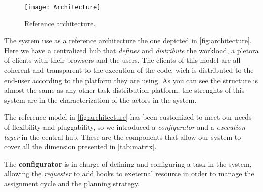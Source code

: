




\begin{figure}[htb]
	\centering
	\texttt{[image: Architecture]}
	\caption{Reference architecture.}
	\label{fig:architecture}
\end{figure}
The system use as a reference architecture the one depicted in \autoref{fig:architecture}.
Here we have a centralized hub that \emph{defines} and \emph{distribute} the workload,
a pletora of clients with their browsers and the users. The clients of this model
are all coherent and transparent to the execution of the code, wich is distributed
to the end-user according to the platform they are using.
As you can see the structure is almost the same as any other task distribution
platform, the strenghts of this system are in the characterization of the actors
in the system.

The reference model in \autoref{fig:architecture} has been customized to meet our
needs of flexibility and pluggability, so we introduced a \emph{configurator} and
a \emph{execution layer} in the central hub. These are the components that allow
our system to cover all the dimension presented in \autoref{tab:matrix}.

The \textbf{configurator} is in charge of defining and configuring a task in the
system, allowing the \emph{requester} to add hooks to exeternal resource in order
to manage the assignment cycle and the planning strategy.

